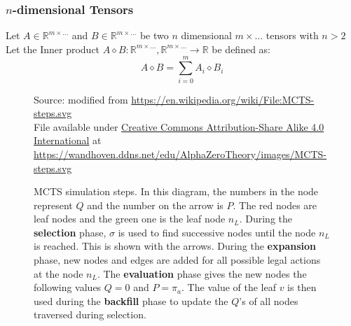 \documentclass[12pt]{article}
\newcommand{\source}[1]{\caption*{Source: {#1}} }
\begin{document}
\subsubsection{\(n\)-dimensional Tensors}
Let \(A \in \mathbb{R}^{m \times \dots}\) and \(B \in \mathbb{R}^{m \times \dots}\) be two \(n\) dimensional \(m \times \dots\) tensors with \(n > 2\)\\
Let the Inner product \(A \diamond B : \mathbb{R}^{m \times \dots}, \mathbb{R}^{m \times \dots} \to \mathbb{R}\) be defined as:
\begin{equation}\label{eq:defs:Inner_product_3d}
A \diamond B = \sum_{i=0}^{m} A_{i} \diamond B_{i}
\end{equation}
%
\begin{figure}
    \centering
	\captionsetup{width=.9\linewidth}
    
		\caption[width=0.7\columnwidth]{MCTS simulation steps. In this diagram, the numbers in the node represent \(Q\) and the number on the arrow is \(P\). The red nodes are leaf nodes and the green one is the leaf node \(n_L\). During the \textbf{selection} phase, \(\sigma\) is used to find successive nodes until the node \(n_L\) is reached. This is shown with the arrows. During the \textbf{expansion} phase, new nodes and edges are added for all possible legal actions at the node \(n_L\). The \textbf{evaluation} phase gives the new nodes the following values \(Q = 0\) and \(P = \pi_a\). The value of the leaf \(v\) is then used during the \textbf{backfill} phase to update the \(Q\)'s of all nodes traversed during selection.}
		\source{modified from \url{https://en.wikipedia.org/wiki/File:MCTS-steps.svg}\\File available under \href{https://creativecommons.org/licenses/by-sa/4.0/deed.en}{Creative Commons Attribution-Share Alike 4.0 International} at \url{https://wandhoven.ddns.net/edu/AlphaZeroTheory/images/MCTS-steps.svg}}
	\label{MCTS-simulation}
\end{figure}
\end{document}
